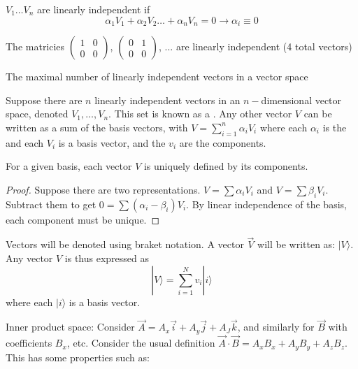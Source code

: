 \documentclass[11pt]{scrartcl}
\begin{document}
\begin{definition}
$ V_1 \ldots V_n$ are linearly independent if $$ \alpha_1 V_1  + \alpha_2 V_2 \ldots + \alpha_n V_n = 0  \rightarrow \alpha_i \equiv 0$$
\end{definition}
\begin{example}
	The matricies $ \begin{pmatrix}
		1 & 0 \\ 0 & 0
	\end{pmatrix}  $, $ \begin{pmatrix}
		0 & 1 \\ 0 & 0
	\end{pmatrix}  $, ... are linearly independent (4 total vectors)
\end{example}

\begin{definition}
[Dimension]
The maximal number of linearly independent vectors in a vector space
\end{definition}

Suppose there are $ n $ linearly independent vectors in an $ n- $dimensional vector space, denoted $ V_1 , \ldots , V_n $. This set is known as a . Any other vector $ V $ can be written as a sum of the basis vectors, with $ V = \sum_{i = 1}^n \alpha_i V_i $ where each $ \alpha_i $ is the   and each $ V_i $ is a basis vector, and the $ v_i $ are the components.

\begin{theorem}
For a given basis, each vector $ V $ is uniquely defined by its components.	
\end{theorem}
\begin{proof}
Suppose there are two representations. $ V = \sum \alpha_i V_i $ and $ V = \sum \beta_i V_i $. Subtract them to get $ 0 = \sum(\alpha_i - \beta_i) V_i $. By linear independence of the basis, each component must be unique.
\end{proof}


Vectors will be denoted using braket notation. A vector $ \vec{V} $ will be written as: $ |V\rangle $. Any vector $ V $ is thus expressed as $$ |V\rangle = \sum_{i = 1}^{N} v_i|i\rangle   $$ where each $ |i\rangle $ is a basis vector.

Inner product space: Consider $ \vec{A} = A_x \vec{i} + A_y \vec{j} + A_J \vec{k} $, and similarly for $ \vec{B} $ with coefficients $ B_x $, etc. Consider the usual definition $ \vec{A} \cdot \vec{B} = A_xB_x + A_yB_y + A_zB_z$. This has some properties such as:
\end{document}
